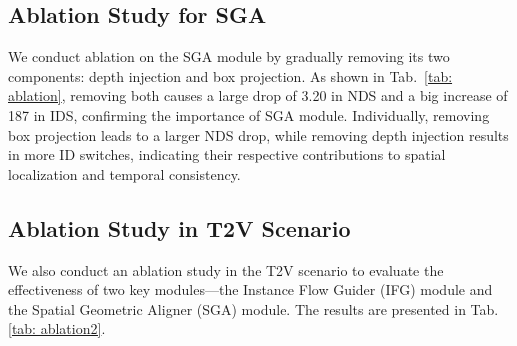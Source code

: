 \subsection{Ablation Study for SGA}
We conduct ablation on the SGA module by gradually removing its two components: depth injection and box projection.
As shown in Tab.~\ref{tab: ablation}, removing both causes a large drop of 3.20 in NDS and a big increase of 187 in IDS, confirming the importance of SGA module.
Individually, removing box projection leads to a larger NDS drop, while removing depth injection results in more ID switches, indicating their respective contributions to spatial localization and temporal consistency.









\subsection{Ablation Study in T2V Scenario}
\label{app: t2v}
We also conduct an ablation study in the T2V scenario to evaluate the effectiveness of two key modules—the Instance Flow Guider (IFG) module and the Spatial Geometric Aligner (SGA) module. The results are presented in Tab.\ref{tab: ablation2}.

